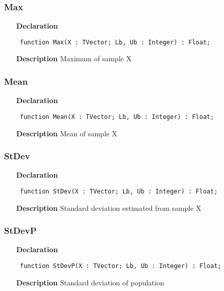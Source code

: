 \documentclass[12pt,a4paper,oneside]{report}
\newcommand{\declarationitem}[1]{\textbf{#1}}
\newcommand{\descriptiontitle}[1]{\textbf{#1}}
\newcommand{\code}[1]{\texttt{#1}}
\begin{document}
\subsubsection{Max}
\label{umeansd_md-Max}
\begin{itemize}\item[\declarationitem{Declaration}\hfill]
	\begin{flushleft}
		\code{
			function Max(X : TVector; Lb, Ub : Integer) : Float;}
	\end{flushleft}
	\item[\descriptiontitle{Description}]
	Maximum of sample X
\end{itemize}
\subsubsection{Mean}
\label{umeansd_md-Mean}
\begin{itemize}\item[\declarationitem{Declaration}\hfill]
	\begin{flushleft}
		\code{
			function Mean(X : TVector; Lb, Ub : Integer) : Float;}
	\end{flushleft}
	\item[\descriptiontitle{Description}]
	Mean of sample X
\end{itemize}
\subsubsection{StDev}
\label{umeansd_md-StDev}
\begin{itemize}\item[\declarationitem{Declaration}\hfill]
	\begin{flushleft}
		\code{
			function StDev(X : TVector; Lb, Ub : Integer) : Float;}
	\end{flushleft}
	\item[\descriptiontitle{Description}]
	Standard deviation estimated from sample X
\end{itemize}
\subsubsection{StDevP}
\label{umeansd_md-StDevP}
\begin{itemize}\item[\declarationitem{Declaration}\hfill]
	\begin{flushleft}
		\code{
			function StDevP(X : TVector; Lb, Ub : Integer) : Float;}
	\end{flushleft}
	\item[\descriptiontitle{Description}]
	Standard deviation of population
\end{itemize}
\end{document}
